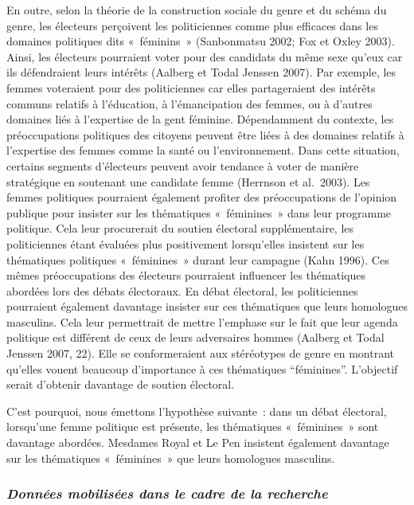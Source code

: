 \documentclass[
  letterpaper,
  DIV=11,
  numbers=noendperiod]{scrartcl}
\begin{document}
En outre, selon la théorie de la construction sociale du genre et du
schéma du genre, les électeurs perçoivent les politiciennes comme plus
efficaces dans les domaines politiques dits «~féminins~» (Sanbonmatsu
2002; Fox et Oxley 2003). Ainsi, les électeurs pourraient voter pour des
candidats du même sexe qu'eux car ils défendraient leurs intérêts
(Aalberg et Todal Jenssen 2007). Par exemple, les femmes voteraient pour
des politiciennes car elles partageraient des intérêts communs relatifs
à l'éducation, à l'émancipation des femmes, ou à d'autres domaines liés
à l'expertise de la gent féminine. Dépendamment du contexte, les
préoccupations politiques des citoyens peuvent être liées à des domaines
relatifs à l'expertise des femmes comme la santé ou l'environnement.
Dans cette situation, certains segments d'électeurs peuvent avoir
tendance à voter de manière stratégique en soutenant une candidate femme
(Herrnson et al.~2003). Les femmes politiques pourraient également
profiter des préoccupations de l'opinion publique pour insister sur les
thématiques «~féminines~» dans leur programme politique. Cela leur
procurerait du soutien électoral supplémentaire, les politiciennes étant
évaluées plus positivement lorsqu'elles insistent sur les thématiques
politiques «~féminines~» durant leur campagne (Kahn 1996). Ces mêmes
préoccupations des électeurs pourraient influencer les thématiques
abordées lors des débats électoraux. En débat électoral, les
politiciennes pourraient également davantage insister sur ces
thématiques que leurs homologues masculins. Cela leur permettrait de
mettre l'emphase sur le fait que leur agenda politique est différent de
ceux de leurs adversaires hommes (Aalberg et Todal Jenssen 2007, 22).
Elle se conformeraient aux stéréotypes de genre en montrant qu'elles
vouent beaucoup d'importance à ces thématiques ``féminines''. L'objectif
serait d'obtenir davantage de soutien électoral.

C'est pourquoi, nous émettons l'hypothèse suivante~: dans un débat
électoral, lorsqu'une femme politique est présente, les thématiques
«~féminines~» sont davantage abordées. Mesdames Royal et Le Pen
insistent également davantage sur les thématiques «~féminines~» que
leurs homologues masculins.

\hypertarget{donnuxe9es-mobilisuxe9es-dans-le-cadre-de-la-recherche}{%
\subsubsection{\texorpdfstring{\textbf{\emph{Données mobilisées dans le
cadre de la
recherche}}}{Données mobilisées dans le cadre de la recherche}}\label{donnuxe9es-mobilisuxe9es-dans-le-cadre-de-la-recherche}}
\end{document}
